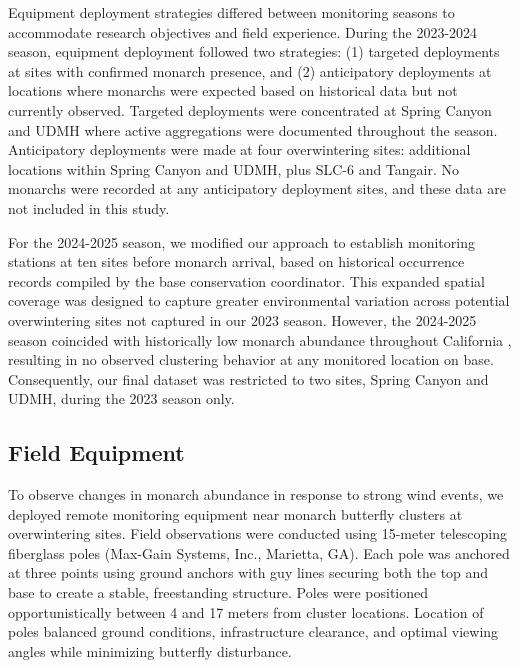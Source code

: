 
Equipment deployment strategies differed between monitoring seasons to accommodate research objectives and field experience. During the 2023-2024 season, equipment deployment followed two strategies: (1) targeted deployments at sites with confirmed monarch presence, and (2) anticipatory deployments at locations where monarchs were expected based on historical data but not currently observed. Targeted deployments were concentrated at Spring Canyon and UDMH where active aggregations were documented throughout the season. Anticipatory deployments were made at four overwintering sites: additional locations within Spring Canyon and UDMH, plus SLC-6 and Tangair. No monarchs were recorded at any anticipatory deployment sites, and these data are not included in this study.

For the 2024-2025 season, we modified our approach to establish monitoring stations at ten sites before monarch arrival, based on historical occurrence records compiled by the base conservation coordinator. This expanded spatial coverage was designed to capture greater environmental variation across potential overwintering sites not captured in our 2023 season. However, the 2024-2025 season coincided with historically low monarch abundance throughout California \autocite{xercesWesternMonarchThanksgiving2025}, resulting in no observed clustering behavior at any monitored location on base. Consequently, our final dataset was restricted to two sites, Spring Canyon and UDMH, during the 2023 season only.

\subsection{Field Equipment}

To observe changes in monarch abundance in response to strong wind events, we deployed remote monitoring equipment near monarch butterfly clusters at overwintering sites. Field observations were conducted using 15-meter telescoping fiberglass poles (Max-Gain Systems, Inc., Marietta, GA). Each pole was anchored at three points using ground anchors with guy lines securing both the top and base to create a stable, freestanding structure. Poles were positioned opportunistically between 4 and 17 meters from cluster locations. Location of poles balanced ground conditions, infrastructure clearance, and optimal viewing angles while minimizing butterfly disturbance.

